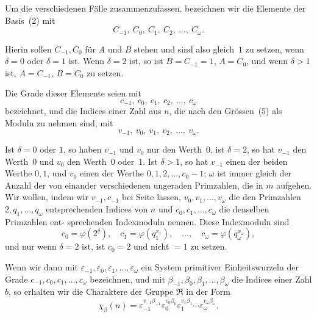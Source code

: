 \documentclass[12pt,a4paper]{article}
\theoremstyle{plain}
\theoremstyle{definition}
\theoremstyle{remark}
\begin{document}
Um die verschiedenen Fälle zusammenzufassen, bezeichnen
wir die Elemente der Basis~(2) mit
\begin{equation}\tag{4}
C_{-1}, \ C_0, \ C_1, \ C_2, \ \ldots, \ C_\omega.
\end{equation}

Hierin sollen $C_{-1}, C_0$ für $A$ und $B$ stehen und sind also
gleich~$1$ zu setzen, wenn $\delta = 0$ oder $\delta = 1$ ist. Wenn $\delta = 2$
ist, so ist $B = C_{-1} = 1$, $A = C_0$, und wenn $\delta > 1$ ist, $A = C_{-1}$,
$B = C_0$ zu setzen.

Die Grade dieser Elemente seien mit
\begin{equation}\tag{5}
c_{-1}, \ c_0, \ c_1, \ c_2, \ \ldots, \ c_\omega
\end{equation}
bezeichnet, und die Indices einer Zahl aus $n$, die nach den
Grössen~(5) als Moduln zu nehmen sind, mit
\begin{equation}\tag{6}
v_{-1}, \ v_0, \ v_1, \ v_2, \ \ldots, \ v_\omega.
\end{equation}

Ist $\delta = 0$ oder $1$, so haben $v_{-1}$ und $v_0$ nur den Werth~$0$,
ist $\delta = 2$, so hat $v_{-1}$ den Werth~$0$ und $v_0$ den Werth~$0$ oder~$1$.
Ist $\delta > 1$, so hat $v_{-1}$ einen der beiden Werthe $0, 1$, und $v_0$
einen der Werthe $0, 1, 2, \ldots, c_0-1$; $\omega$ ist immer gleich der
Anzahl der von einander verschiedenen ungeraden Primzahlen,
die in $m$ aufgehen. Wir wollen, indem wir $v_{-1}, c_{-1}$ bei Seite
lassen, $v_0, v_1, \ldots, v_\omega$ die den Primzahlen $2, q_1, \ldots, q_\omega$ entsprechenden
Indices von $n$ und $c_0, c_1, \ldots, c_\omega$ die denselben Primzahlen ent-
sprechenden Indexmoduln nennen. Diese Indexmoduln sind
\[
c_0 = \varphi(2^\delta), \quad c_1 = \varphi(q_1^{x_1}), \quad \ldots, \quad c_\omega = \varphi(q_\omega^{x_\omega}),
\]
und nur wenn $\delta = 2$ ist, ist $c_0 = 2$ und nicht $= 1$ zu setzen.

Wenn wir dann mit $\varepsilon_{-1}, \varepsilon_0, \varepsilon_1, \ldots, \varepsilon_\omega$ ein System primitiver
Einheitswurzeln der Grade $c_{-1}, c_0, c_1, \ldots, c_\omega$ bezeichnen, und mit
$\beta_{-1}, \beta_0, \beta_1, \ldots, \beta_\omega$ die Indices einer Zahl $b$, so erhalten wir die
Charaktere der Gruppe $\mathfrak{R}$ in der Form
\begin{equation}\tag{7}
\chi_\beta(n) = \varepsilon_{-1}^{v_{-1}\beta_{-1}} \varepsilon_0^{v_0\beta_0} \varepsilon_1^{v_1\beta_1} \cdots \varepsilon_\omega^{v_\omega\beta_\omega}.
\end{equation}
\end{document}
